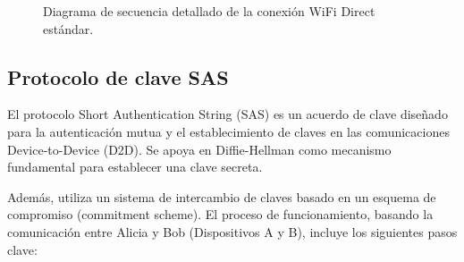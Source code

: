 \documentclass[conference,a4paper,onecolumn,11pt]{IEEEtran} %
\begin{document}
\begin{figure}[htbp]
\caption{Diagrama de secuencia detallado de la conexión WiFi Direct estándar.}
\label{fig:diagrama_fases}
\end{figure}



\subsection{Protocolo de clave SAS}
El protocolo Short Authentication String (SAS) es un acuerdo de clave diseñado para la autenticación mutua y el establecimiento de claves en las comunicaciones Device-to-Device (D2D). Se apoya en  Diffie-Hellman como mecanismo fundamental para establecer una clave secreta. 

Además, utiliza un sistema de intercambio de claves basado en un esquema de compromiso (commitment scheme). El proceso de funcionamiento, basando la comunicación entre Alicia y Bob (Dispositivos A y B), incluye los siguientes pasos clave:
\end{document}
